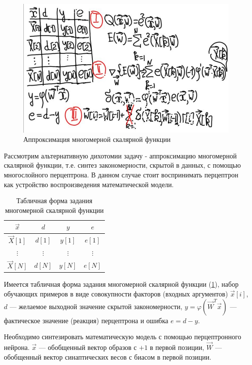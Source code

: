 \documentclass{article}
\numberwithin{equation}{subsection}
\begin{document}
\begin{figure}[htbp]
    \centering
    \includegraphics[height=7cm]{hyperflat_9_1.jpeg}
    \caption{Аппроксимация многомерной скалярной функции}
    \label{hyperflat_9_1}
\end{figure}

Рассмотрим альтернативную дихотомии задачу - аппроксимацию многомерной скалярной функции,  т.е.
синтез закономерности, скрытой в данных, с помощью многослойного перцептрона.
В данном случае стоит воспринимать перцептрон как устройство воспроизведения математической модели.

\begin{table}[H]
    \centering
    \begin{tabular}{| c | c | c | c |}
        \hline
        $\vec{x}$ & $d$ & $y$ & $e$ \\
        \hline
        $\vec{X}[1]$ & $d[1]$ & $y[1]$ & $e[1]$ \\
        \hline
        $\vdots$ & $\vdots$ & $\vdots$ & $\vdots$ \\
        \hline
        $\vec{X}[N]$ & $d[N]$ & $y[N]$ & $e[N]$ \\
        \hline
    \end{tabular}
    \label{table:scalar-func-table}
    \caption{Табличная форма задания многомерной скалярной функции}
\end{table}

Имеется табличная форма задания многомерной скалярной функции (\ref{table:scalar-func-table}), 
набор обучающих примеров в виде совокупности факторов (входных аргументов) $\vec{x}[i]$, $d$ ---
желаемое выходной значение скрытой закономерности, $y = \varphi (\vec{W}^T \vec{x})$ ---
фактическое значение (реакция) перцептрона и ошибка $e = d - y$.

Необходимо синтезировать математическую модель с помощью перцептронного нейрона. 
$\vec{x}$ --- обобщенный вектор образов с $+1$ в первой позиции, $\vec{W}$ ---
обобщенный вектор синаптических весов с биасом в первой позиции.
\end{document}
